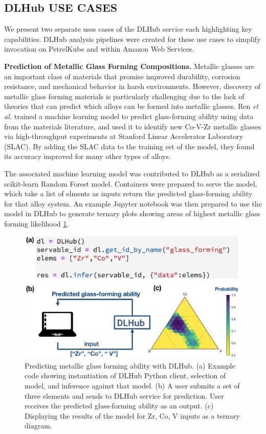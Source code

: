 \documentclass{aip-cp}
\begin{document}
\subsection{DLHub USE CASES}
We present two separate uses cases of the DLHub service each highlighting
key capabilities. DLHub analysis pipelines were created for these
use cases to simplify invocation on PetrelKube and within Amazon Web Services.

\textbf{Prediction of Metallic Glass Forming Compositions.}
Metallic glasses are an important class of materials that promise
improved durability, corrosion resistance, and mechanical behavior in harsh
environments. However, discovery of metallic glass forming materials is
particularly challenging due to the lack of theories that can predict which
alloys can be formed into metallic glasses. Ren \emph{et al.}
trained a machine learning model to predict glass-forming ability using data 
from the materials literature, and used it to identify new Co-V-Zr metallic glasses
via high-throughput experiments at Stanford Linear Accelerator
Laboratory (SLAC). By adding the SLAC data to the training set of the model,
they found its accuracy improved for many other types of alloys.

The associated machine learning model was contributed to DLHub as a
serialized scikit-learn Random Forest model. Containers were prepared to serve the
model, which take a list of elments as inputs return the predicted glass-forming ability
for that alloy system. An example Jupyter notebook was then prepared to use the model in DLHub 
to generate ternary plots showing areas of highest metallic glass forming likelihood \ref{fig:dlhub-glass}.

\begin{figure}[h]
  \centerline{\includegraphics[width=5in]{Figs/DLHub-metallic-glass.png}}
  \caption{Predicting metallic glass forming ability with DLHub. (a) Example code showing instantiation of DLHub Python client, selection of model, and inference against that model. (b) A user submits a set of three elements and sends to DLHub service for prediction. User receives the predicted glass-forming ability as an output. (c) Displaying the results of the model for Zr, Co, V inputs as a ternary diagram.
\label{fig:dlhub-glass}}
\end{figure}
\end{document}
